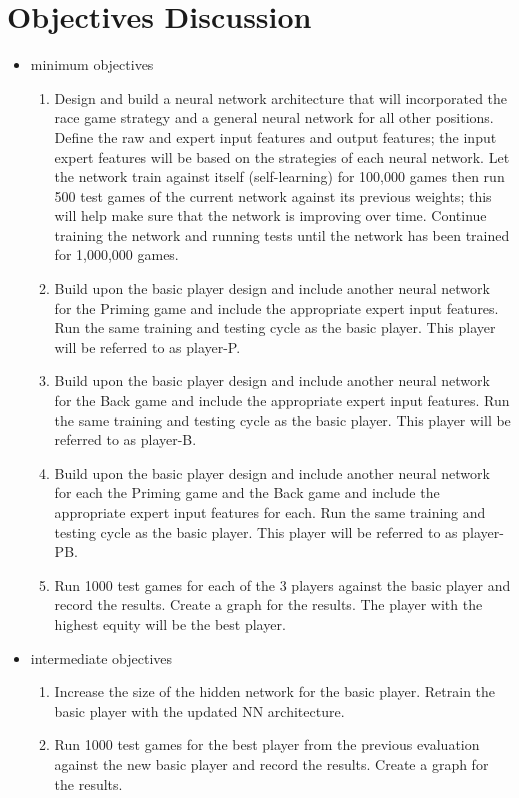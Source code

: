 \chapter{Objectives Discussion}
\begin{itemize}
\item minimum objectives
\begin{enumerate}
\item Design and build a neural network architecture that will incorporated the race game strategy and a general neural network for all other positions. Define the raw and expert input features and output features; the input expert features will be based on the strategies of each neural network. Let the network train against itself (self-learning) for 100,000 games then run 500 test games of the current network against its previous weights; this will help make sure that the network is improving over time. Continue training the network and running tests until the network has been trained for 1,000,000 games.  
\item Build upon the basic player design and include another neural network for the Priming game and include the appropriate expert input features. Run the same training and testing cycle as the basic player. This player will be referred to as player-P.
\item Build upon the basic player design and include another neural network for the Back game and include the appropriate expert input features. Run the same training and testing cycle as the basic player. This player will be referred to as player-B.
\item Build upon the basic player design and include another neural network for each the Priming game and the Back game and include the appropriate expert input features for each. Run the same training and testing cycle as the basic player. This player will be referred to as player-PB.
\item Run 1000 test games for each of the 3 players against the basic player and record the results. Create a graph for the results. The player with the highest equity will be the best player.
\end{enumerate}

\item intermediate objectives
\begin{enumerate}
\item Increase the size of the hidden network for the basic player. Retrain the basic player with the updated NN architecture.
\item Run 1000 test games for the best player from the previous evaluation against the new basic player and record the results. Create a graph for the results.
\end{enumerate}


\end{itemize}
